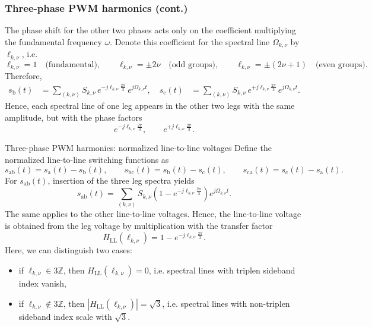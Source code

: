 \begin{frame}
    \frametitle{Three-phase PWM harmonics (cont.)}
    The phase shift for the other two phases acts only on the coefficient multiplying the fundamental frequency $\omega$. Denote this coefficient for the spectral line $\Omega_{k,\nu}$ by $\ell_{k,\nu}$, i.e.
    \[
        \ell_{k,\nu}=1\quad\text{(fundamental)},\qquad
        \ell_{k,\nu}=\pm 2\nu\quad\text{(odd groups)},\qquad
        \ell_{k,\nu}=\pm(2\nu+1)\quad\text{(even groups)}.
    \]
    Therefore,
    \begin{align*}
        s_\mathrm{b}(t)
         & =
        \sum_{(k,\nu)}
        S_{k,\nu}\,e^{-j\ell_{k,\nu}\frac{2\pi}{3}}\,e^{j\Omega_{k,\nu}t},
        \quad
        s_\mathrm{c}(t)
         & =
        \sum_{(k,\nu)}
        S_{k,\nu}\,e^{+j\ell_{k,\nu}\frac{2\pi}{3}}\,e^{j\Omega_{k,\nu}t}.
    \end{align*}
    Hence, each spectral line of one leg appears in the other two legs
    with the same amplitude, but with the phase factors
    \[
        e^{-j\ell_{k,\nu}\frac{2\pi}{3}},
        \qquad
        e^{+j\ell_{k,\nu}\frac{2\pi}{3}}.
    \]
\end{frame}

\begin{frame}{Three-phase PWM harmonics: normalized line-to-line voltages}
    Define the normalized line-to-line switching functions as
    \[
        s_{\mathrm{ab}}(t)=s_\mathrm{a}(t)-s_\mathrm{b}(t),
        \qquad
        s_{\mathrm{bc}}(t)=s_\mathrm{b}(t)-s_\mathrm{c}(t),
        \qquad
        s_{\mathrm{ca}}(t)=s_\mathrm{c}(t)-s_\mathrm{a}(t).
    \]
    For $s_{\mathrm{ab}}(t)$, insertion of the three leg spectra yields
    \[
        s_{\mathrm{ab}}(t)
        =
        \sum_{(k,\nu)}
        S_{k,\nu}\left(1-e^{-j\ell_{k,\nu}\frac{2\pi}{3}}\right)e^{j\Omega_{k,\nu}t}.
    \]
    The same applies to the other line-to-line voltages. Hence, the line-to-line voltage is obtained from the leg voltage by multiplication with the transfer factor
    \[
        H_{\mathrm{LL}}(\ell_{k,\nu})=1-e^{-j\ell_{k,\nu}\frac{2\pi}{3}}.
    \]
    Here, we can distinguish two cases:
    \begin{itemize}
        \item if $\ell_{k,\nu}\in 3\mathbb{Z}$, then $H_{\mathrm{LL}}(\ell_{k,\nu})=0$, i.e. spectral lines with triplen sideband index vanish,
        \item if $\ell_{k,\nu}\notin 3\mathbb{Z}$, then $|H_{\mathrm{LL}}(\ell_{k,\nu})|=\sqrt{3}$, i.e. spectral lines with non-triplen sideband index scale with $\sqrt{3}$.
    \end{itemize}
\end{frame}


